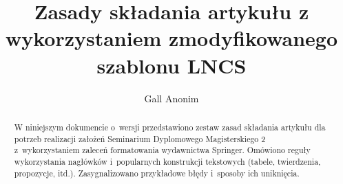 

\title{Zasady składania artykułu z wykorzystaniem zmodyfikowanego szablonu LNCS}
\author{Gall Anonim}



\maketitle

\begin{abstract}
	W niniejszym dokumencie o~wersji przedstawiono zestaw zasad składania artykułu dla potrzeb realizacji założeń Seminarium Dyplomowego Magisterskiego 2 z~wykorzystaniem zaleceń formatowania wydawnictwa Springer. Omówiono reguły wykorzystania nagłówków i~popularnych konstrukcji tekstowych (tabele, twierdzenia, propozycje, itd.). Zasygnalizowano przykładowe błędy i~sposoby ich uniknięcia.

\end{abstract}







